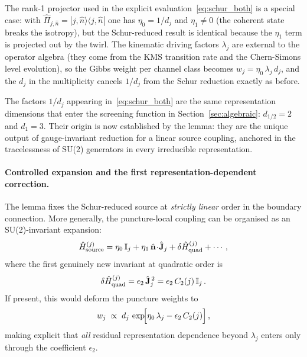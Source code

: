 \documentclass[aps,prd,twocolumn,10pt,superscriptaddress,nofootinbib]{revtex4-2}
\begin{document}
The rank-1 projector used in the explicit
evaluation~\eqref{eq:schur_both} is a special case: with
$\hat{\Pi}_{j,\hat{n}} = |j,\hat{n}\rangle\langle j,\hat{n}|$
one has $\eta_0 = 1/d_j$ and $\eta_1 \neq 0$ (the coherent state
breaks the isotropy), but the Schur-reduced result is identical
because the $\eta_1$ term is projected out by the twirl.  The
kinematic driving factors $\lambda_j$ are external to the operator
algebra (they come from the KMS transition rate and the
Chern-Simons level evolution), so the Gibbs weight per channel
class becomes $w_j = \eta_0\,\lambda_j\,d_j$, and the $d_j$ in the
multiplicity cancels $1/d_j$ from the Schur reduction exactly as
before.

The factors $1/d_j$ appearing in~\eqref{eq:schur_both} are the
same representation dimensions that enter the screening function
in Section~\ref{sec:algebraic}: $d_{1/2} = 2$ and $d_1 = 3$.
Their origin is now established by the lemma: they are the unique
output of gauge-invariant reduction for a linear source coupling,
anchored in the tracelessness of SU(2) generators in every
irreducible representation.

\paragraph{Controlled expansion and the first
representation-dependent correction.}

The lemma fixes the Schur-reduced source at \emph{strictly linear}
order in the boundary connection.  More generally, the
puncture-local coupling can be organised as an SU(2)-invariant
expansion:
\begin{equation}
\hat{H}_{\rm source}^{(j)}
  = \eta_0\,\mathbb{I}_j
    + \eta_1\,\hat{\mathbf{n}}\!\cdot\!\hat{\mathbf{J}}_j
    + \delta\hat{H}^{(j)}_{\rm quad} + \cdots\,,
\label{eq:Hs_expansion}
\end{equation}
where the first genuinely new invariant at quadratic order is
\begin{equation}
\delta\hat{H}^{(j)}_{\rm quad}
  = \epsilon_2\,\hat{\mathbf{J}}_j^{\,2}
  = \epsilon_2\,C_2(j)\,\mathbb{I}_j\,.
\label{eq:quad_correction}
\end{equation}
If present, this would deform the puncture weights to
\begin{equation}
w_j \;\propto\;
  d_j\,\exp\!\Bigl[\eta_0\,\lambda_j
    - \epsilon_2\,C_2(j)\Bigr]\,,
\label{eq:w_with_C2}
\end{equation}
making explicit that \emph{all} residual representation dependence
beyond $\lambda_j$ enters only through the coefficient
$\epsilon_2$.
\end{document}
